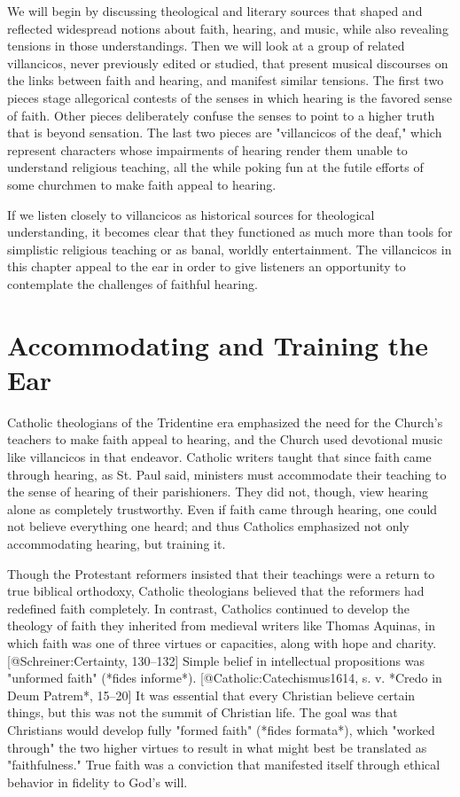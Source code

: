 We will begin by discussing theological and literary sources that shaped and
reflected widespread notions about faith, hearing, and music, while also
revealing tensions in those understandings.
Then we will look at a group of related villancicos, never previously edited or
studied, that present musical discourses on the links between faith and hearing,
and manifest similar tensions. 
The first two pieces stage allegorical contests of the senses in which hearing
is the favored sense of faith. 
Other pieces deliberately confuse the senses to point to a higher truth that is
beyond sensation. 
The last two pieces are "villancicos of the deaf," which represent characters
whose impairments of hearing render them unable to understand religious
teaching, all the while poking fun at the futile efforts of some churchmen to
make faith appeal to hearing.

If we listen closely to villancicos as historical sources for theological
understanding, it becomes clear that they functioned as much more than tools for
simplistic religious teaching or as banal, worldly entertainment.
The villancicos in this chapter appeal to the ear in order to give listeners an
opportunity to contemplate the challenges of faithful hearing. 

\section{Accommodating and Training the Ear}

Catholic theologians of the Tridentine era emphasized the need for the Church's
teachers to make faith appeal to hearing, and the Church used devotional music
like villancicos in that endeavor. 
Catholic writers taught that since faith came through hearing, as St. Paul said,
ministers must accommodate their teaching to the sense of hearing of their
parishioners. 
They did not, though, view hearing alone as completely trustworthy. 
Even if faith came through hearing, one could not believe everything one heard;
and thus Catholics emphasized not only accommodating hearing, but training it. 

Though the Protestant reformers insisted that their teachings were a return to
true biblical orthodoxy, Catholic theologians believed that the reformers had
redefined faith completely. 
In contrast, Catholics continued to develop the theology of faith they inherited
from medieval writers like Thomas Aquinas, in which faith was one of three
virtues or capacities, along with hope and charity.
[@Schreiner:Certainty, 130--132]
Simple belief in intellectual propositions was "unformed faith" 
(*fides informe*).
[@Catholic:Catechismus1614, s. v. *Credo in Deum Patrem*, 15--20]
It was essential that every Christian believe certain things, but this was not
the summit of Christian life.
The goal was that Christians would develop fully "formed faith" 
(*fides formata*), which "worked through" the two higher virtues to result in 
what might best be translated as "faithfulness." 
True faith was a conviction that manifested itself through ethical behavior in
fidelity to God's will.

